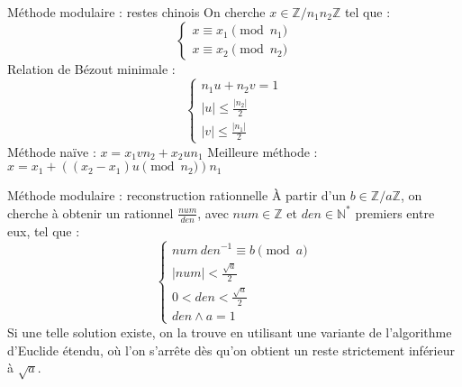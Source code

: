 \documentclass[11pt]{beamer}
\begin{document}
	\begin{frame}{Méthode modulaire : restes chinois}
		On cherche $x \in \mathbb{Z}/n_1n_2\mathbb{Z}$ tel que :
		\begin{equation*}
			\begin{cases}
				x \equiv x_1 \pmod {n_1}\\
				x \equiv x_2 \pmod {n_2}
			\end{cases}
		\end{equation*}
		Relation de Bézout minimale :
		\begin{equation*}
			\begin{cases}
				n_1 u + n_2 v = 1\\
				\lvert u \rvert \leq \frac{\lvert n_2 \rvert}{2}\\
				\lvert v \rvert  \leq \frac{\lvert n_1 \rvert}{2}
			\end{cases}
		\end{equation*}
		Méthode naïve : $x = x_1 v n_2 + x_2 u n_1$
		\newline
		Meilleure méthode : $x = x_1 + ((x_2 - x_1) u \pmod{n_2}) n_1$
	\end{frame}
	
	\begin{frame}{Méthode modulaire : reconstruction rationnelle}
		À partir d'un $b \in \mathbb{Z}/a\mathbb{Z}$, on cherche à obtenir un rationnel $\frac{num}{den}$, avec $num \in \mathbb{Z}$ et $den \in \mathbb{N}^*$ premiers entre eux, tel que :
		\begin{equation*}
			\begin{cases}
				num \  den^{-1} \equiv b \pmod a\\
				\lvert num \rvert < \frac{\sqrt{a}}{2}\\
				0 < den < \frac{\sqrt{a}}{2}\\
				den \wedge a = 1
			\end{cases}
		\end{equation*}
		Si une telle solution existe, on la trouve en utilisant une variante de l'algorithme d'Euclide étendu, où l'on s'arrête dès qu'on obtient un reste strictement inférieur à $\sqrt{a}$.
	\end{frame}
	
\end{document}

